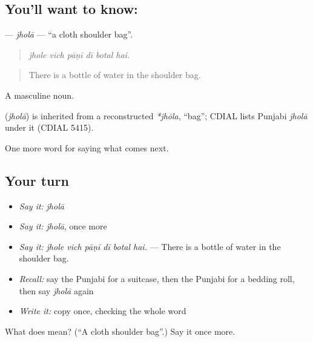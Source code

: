 \subsection*{You'll want to know: }
\textbf{} — \emph{jholā} — \textquotedblleft{}a cloth shoulder bag\textquotedblright{}.

\begin{quote}
     
\end{quote}

\begin{quote}
\emph{jhole vich pāṇī dī botal hai.}
\end{quote}

\begin{quote}
There is a bottle of water in the shoulder bag.
\end{quote}

A masculine noun.

\begin{cousinweb}
\textbf{} (\emph{jholā}) is inherited from a reconstructed \emph{*jhōla}, \textquotedblleft{}bag\textquotedblright{}; CDIAL lists Punjabi \emph{jholā} under it (CDIAL 5415).
\end{cousinweb}

\begin{grammarlens}[title={What you've built}]
One more word for saying what comes next.
\end{grammarlens}

\subsection*{Your turn}
\begin{itemize}
\raggedright
  \item \emph{Say it:} \emph{jholā}
  \item \emph{Say it:} \emph{jholā}, once more
  \item \emph{Say it:} \emph{jhole vich pāṇī dī botal hai.} — There is a bottle of water in the shoulder bag.
  \item \emph{Recall:} say the Punjabi for a suitcase, then the Punjabi for a bedding roll, then say \emph{jholā} again
  \item \emph{Write it:} copy \textbf{} once, checking the whole word
\end{itemize}

\begin{tcolorbox}[breakable,colback=teal!4,colframe=teal!35!black,title={Before you move on}]
What does  mean? (\textquotedblleft{}A cloth shoulder bag\textquotedblright{}.) Say it once more.
\end{tcolorbox}
